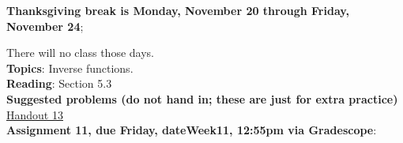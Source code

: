 \documentclass[12pt]{article}
\newcommand{\HWdueTime}{12:55pm }
\begin{document}
\noindent \textbf{Thanksgiving break is Monday, November 20 through Friday, November 24};

\noindent There will no class those days.
\\

\noindent \noindent\textbf{Topics}: Inverse functions.
\\

\noindent \textbf{Reading}: Section 5.3
\\

\noindent \textbf{Suggested problems (do not hand in; these are just for extra practice)} \href{https://www.math.emory.edu/~dzb/teaching/250Spring2021/handouts/250-H13-inverses.pdf}{Handout 13}
\\

\noindent \textbf{Assignment 11, due Friday, \csname dateWeek11\endcsname, \HWdueTime via Gradescope}:
\end{document}
